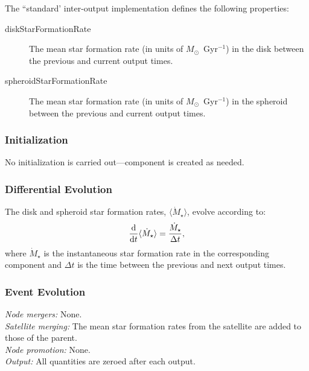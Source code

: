 The ``standard' inter-output implementation defines the following properties:
\begin{description}
 \item [{\normalfont \ttfamily diskStarFormationRate}] The mean star formation rate (in units of $M_\odot$~Gyr$^{-1}$) in the disk between the previous and current output times.
 \item [{\normalfont \ttfamily spheroidStarFormationRate}] The mean star formation rate (in units of $M_\odot$~Gyr$^{-1}$) in the spheroid between the previous and current output times.
\end{description}

\subsubsection{Initialization}

No initialization is carried out---component is created as needed.

\subsubsection{Differential Evolution}

The disk and spheroid star formation rates, $\langle \dot{M}_\star \rangle$, evolve according to:
\begin{equation}
{\mathrm{d} \over \mathrm{d} t} \langle \dot{M}_\star \rangle = {\dot{M}_\star \over \Delta t},
\end{equation}
where $\dot{M}_\star$ is the instantaneous star formation rate in the corresponding component and $\Delta t$ is the time between the previous and next output times.

\subsubsection{Event Evolution}

\noindent\emph{Node mergers:} None.\\

\noindent\emph{Satellite merging:} The mean star formation rates from the satellite are added to those of the parent.\\

\noindent\emph{Node promotion:} None.\\

\noindent\emph{Output:} All quantities are zeroed after each output.\\

